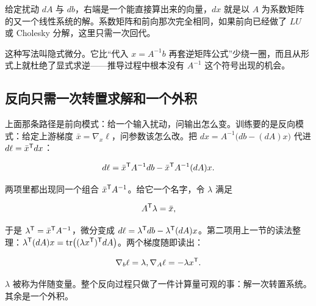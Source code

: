 给定扰动 \(dA\) 与 \(db\)，右端是一个能直接算出来的向量，\(dx\) 就是以 \(A\) 为系数矩阵的又一个线性系统的解。系数矩阵和前向那次完全相同，如果前向已经做了 \(LU\) 或 Cholesky 分解，这里只需一次回代。

这种写法叫隐式微分。它比``代入 \(x=A^{-1}b\) 再套逆矩阵公式''少绕一圈，而且从形式上就杜绝了显式求逆——推导过程中根本没有 \(A^{-1}\) 这个符号出现的机会。

\subsection{反向只需一次转置求解和一个外积}

上面那条路径是前向模式：给一个输入扰动，问输出怎么变。训练要的是反向模式：给定上游梯度 \(\bar x=\nabla_x\ell\)，问参数该怎么改。把 \(dx=A^{-1}\bigl(db-(dA)x\bigr)\) 代进 \(d\ell=\bar x^{\mathsf{T}}dx\)：

\[
d\ell=\bar x^{\mathsf{T}}A^{-1}db-\bar x^{\mathsf{T}}A^{-1}(dA)x.
\]

两项里都出现同一个组合 \(\bar x^{\mathsf{T}}A^{-1}\)。给它一个名字，令 \(\lambda\) 满足

\[
A^{\mathsf{T}}\lambda=\bar x,
\]

于是 \(\lambda^{\mathsf{T}}=\bar x^{\mathsf{T}}A^{-1}\)，微分变成 \(d\ell=\lambda^{\mathsf{T}}db-\lambda^{\mathsf{T}}(dA)x\)。第二项用上一节的读法整理：\(\lambda^{\mathsf{T}}(dA)x=\operatorname{tr}\bigl((\lambda x^{\mathsf{T}})^{\mathsf{T}}dA\bigr)\)。两个梯度随即读出：

\[
\nabla_b\ell=\lambda,
\space
\nabla_A\ell=-\lambda x^{\mathsf{T}}.
\]

\(\lambda\) 被称为伴随变量。整个反向过程只做了一件计算量可观的事：解一次转置系统。其余是一个外积。

